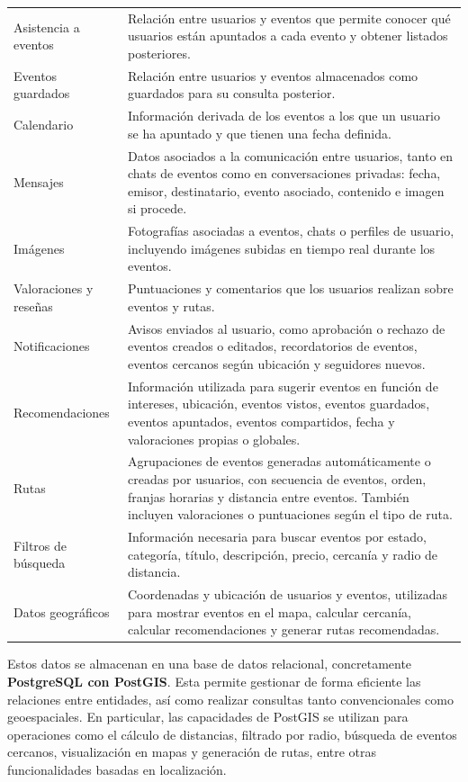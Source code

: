 {\begin{longtable}{@{}>{\raggedright\arraybackslash}p{} >{\raggedright\arraybackslash}p{}@{}}
Asistencia a eventos & Relación entre usuarios y eventos que permite conocer qué usuarios están apuntados a cada evento y obtener listados posteriores. \\
Eventos guardados & Relación entre usuarios y eventos almacenados como guardados para su consulta posterior. \\
Calendario & Información derivada de los eventos a los que un usuario se ha apuntado y que tienen una fecha definida. \\
Mensajes & Datos asociados a la comunicación entre usuarios, tanto en chats de eventos como en conversaciones privadas: fecha, emisor, destinatario, evento asociado, contenido e imagen si procede. \\
Imágenes & Fotografías asociadas a eventos, chats o perfiles de usuario, incluyendo imágenes subidas en tiempo real durante los eventos. \\
Valoraciones y reseñas & Puntuaciones y comentarios que los usuarios realizan sobre eventos y rutas. \\
Notificaciones & Avisos enviados al usuario, como aprobación o rechazo de eventos creados o editados, recordatorios de eventos, eventos cercanos según ubicación y seguidores nuevos. \\
Recomendaciones & Información utilizada para sugerir eventos en función de intereses, ubicación, eventos vistos, eventos guardados, eventos apuntados, eventos compartidos, fecha y valoraciones propias o globales. \\
Rutas & Agrupaciones de eventos generadas automáticamente o creadas por usuarios, con secuencia de eventos, orden, franjas horarias y distancia entre eventos. También incluyen valoraciones o puntuaciones según el tipo de ruta. \\
Filtros de búsqueda & Información necesaria para buscar eventos por estado, categoría, título, descripción, precio, cercanía y radio de distancia. \\
Datos geográficos & Coordenadas y ubicación de usuarios y eventos, utilizadas para mostrar eventos en el mapa, calcular cercanía, calcular recomendaciones y generar rutas recomendadas. \\
\end{longtable}
}

\vspace{0.1cm}

Estos datos se almacenan en una base de datos relacional, concretamente \textbf{PostgreSQL con PostGIS}. Esta permite gestionar de forma eficiente las relaciones entre entidades, así como realizar consultas tanto convencionales como geoespaciales. En particular, las capacidades de PostGIS se utilizan para operaciones como el cálculo de distancias, filtrado por radio, búsqueda de eventos cercanos, visualización en mapas y generación de rutas, entre otras funcionalidades basadas en localización.

